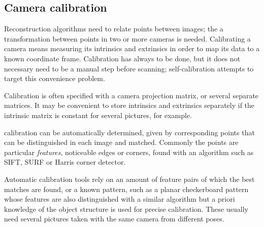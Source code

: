 

\subsection{Camera calibration} %

Reconstruction algorithms need to relate points between images; the a transformation between points in two or more cameras is needed.
Calibrating a camera means measuring its intrinsics and extrinsics in order to map its data to a known coordinate frame.
Calibration has always to be done, but it does not necessary need to be a manual step before scanning;
self-calibration attempts to target this convenience problem. \cite{pollefeys1999hand,hartley03multiview}

Calibration is often specified with a camera projection matrix, or several separate matrices.
It may be convenient to store intrinsics and extrinsics separately if the intrinsic matrix is constant for several pictures, for example.

calibration can be automatically determined, given by corresponding points that can be distinguished in each image and matched. Commonly the points are particular \emph{features}, noticeable edges or corners, found with an algorithm such as SIFT, SURF or Harris corner detector. %




Automatic calibration tools rely on an amount of feature pairs of which the best matches are found, or a known pattern, such as a planar checkerboard pattern \cite{chuang2002performance,zhang2000flexible} whose features are also distinguished with a similar algorithm but a priori knowledge of the object structure is used for precise calibration.
These usually need several pictures taken with the same camera from different poses.

